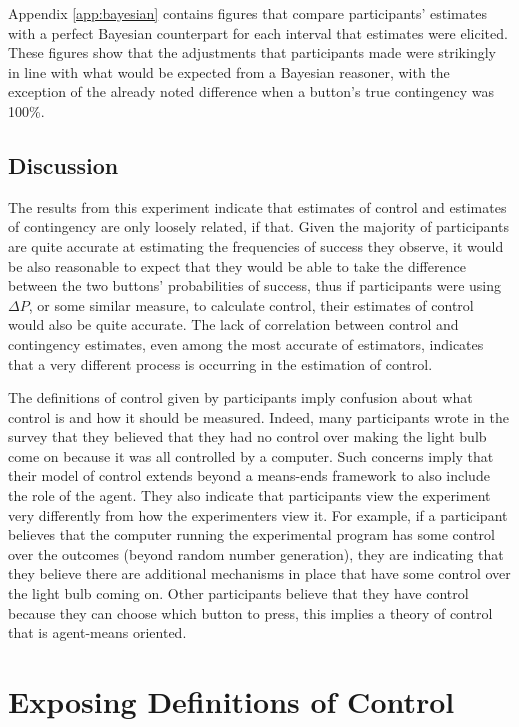 \documentclass[USenglish,letterpaper,12pt,extrafontsizes,oneside,onecolumn,final]{memoir}
\newcommand{\deltap}{$\Delta P$}
\begin{document}
Appendix \ref{app:bayesian} contains figures that compare participants' estimates with a perfect Bayesian counterpart for each interval that estimates were elicited.  These figures show that the adjustments that participants made were strikingly in line with what would be expected from a Bayesian reasoner, with the exception of the already noted difference when a button's true contingency was 100\%.  

\section{Discussion}

The results from this experiment indicate that estimates of control and estimates of contingency are only loosely related, if that.  Given the majority of participants are quite accurate at estimating the frequencies of success they observe, it would be also reasonable to expect that they would be able to take the difference between the two buttons' probabilities of success, thus if participants were using \deltap, or some similar measure, to calculate control, their estimates of control would also be quite accurate.  The lack of correlation between control and contingency estimates, even among the most accurate of estimators, indicates that a very different process is occurring in the estimation of control. 

The definitions of control given by participants imply confusion about what control is and how it should be measured.  Indeed, many participants wrote in the survey that they believed that they had no control over making the light bulb come on because it was all controlled by a computer.  Such concerns imply that their model of control extends beyond a means-ends framework to also include the role of the agent.  They also indicate that participants view the experiment very differently from how the experimenters view it.  For example, if a participant believes that the computer running the experimental program has some control over the outcomes (beyond random number generation), they are indicating that they believe there are additional mechanisms in place that have some control over the light bulb coming on.  Other participants believe that they have control because they can choose which button to press, this implies a theory of control that is agent-means oriented.  

\chapter{Exposing Definitions of Control}
\label{chap:explore}
\end{document}
